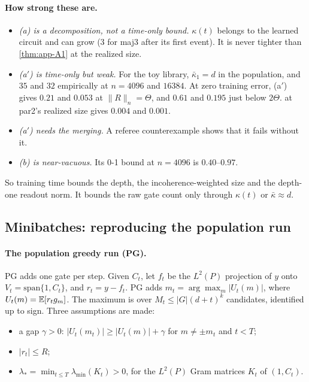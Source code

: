 \paragraph{How strong these are.}
\begin{itemize}[nosep]
\item \emph{(a) is a decomposition, not a time-only bound.} $\kappa(t)$ belongs to the learned circuit and can grow (3 for maj3 after its first event). It is never tighter than \cref{thm:app-A1} at the realized size.
\item \emph{(a$'$) is time-only but weak.} For the toy library, $\bar\kappa_1=d$ in the population, and $35$ and $32$ empirically at $n=4096$ and $16384$. At zero training error, (a$'$) gives $0.21$ and $0.053$ at $\|R\|_n=\Theta$, and $0.61$ and $0.195$ just below $2\Theta$.  at par2's realized size gives $0.004$ and $0.001$.
\item \emph{(a$'$) needs the merging.} A referee counterexample shows that it fails without it.
\item \emph{(b) is near-vacuous.} Its 0-1 bound at $n=4096$ is $0.40$--$0.97$.
\end{itemize}
So training time bounds the depth, the incoherence-weighted size and the depth-one readout norm. It bounds the raw gate count only through $\kappa(t)$ or $\bar\kappa\approx d$.

\subsection{Minibatches: reproducing the population run}\label{app:discrete:sgd}

\paragraph{The population greedy run (PG).} PG adds one gate per step. Given $C_t$, let $f_t$ be the $L^2(P)$ projection of $y$ onto $V_t=\mathrm{span}\{1,C_t\}$, and $r_t=y-f_t$. PG adds $m_t=\arg\max_m|U_t(m)|$, where $U_t(m)=\mathbb{E}[r_tg_m]$. The maximum is over $M_t\le|G|(d+t)^k$ candidates, identified up to sign. Three assumptions are made:
\begin{itemize}[nosep]
\item a gap $\gamma>0$: $|U_t(m_t)|\ge|U_t(m)|+\gamma$ for $m\ne\pm m_t$ and $t<T$;
\item $|r_t|\le R$;
\item $\lambda_*=\min_{t\le T}\lambda_{\min}(K_t)>0$, for the $L^2(P)$ Gram matrices $K_t$ of $(1,C_t)$.
\end{itemize}

